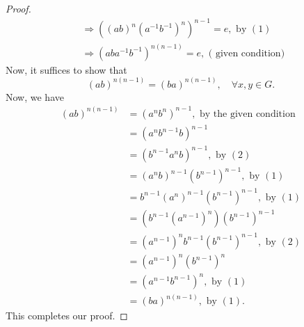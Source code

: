 \documentclass{article}
\begin{document}
\begin{proof}
$$\begin{aligned}
& \Longrightarrow\left((a b)^n\left(a^{-1} b^{-1}\right)^n\right)^{n-1}=e, \text { by }(1) \\
& \Longrightarrow\left(a b a^{-1} b^{-1}\right)^{n(n-1)}=e, \text { ( given condition) }
\end{aligned}
$$
Now, it suffices to show that
$$
(a b)^{n(n-1)}=(b a)^{n(n-1)}, \quad \forall x, y \in G .
$$
Now, we have
$$
\begin{aligned}
(a b)^{n(n-1)} & =\left(a^n b^n\right)^{n-1}, \text { by the given condition } \\
& =\left(a^n b^{n-1} b\right)^{n-1} \\
& =\left(b^{n-1} a^n b\right)^{n-1}, \text { by }(2) \\
& =\left(a^n b\right)^{n-1}\left(b^{n-1}\right)^{n-1}, \text { by }(1) \\
& =b^{n-1}\left(a^n\right)^{n-1}\left(b^{n-1}\right)^{n-1}, \text { by }(1) \\
& =\left(b^{n-1}\left(a^{n-1}\right)^n\right)\left(b^{n-1}\right)^{n-1} \\
& =\left(a^{n-1}\right)^n b^{n-1}\left(b^{n-1}\right)^{n-1}, \text { by }(2) \\
& =\left(a^{n-1}\right)^n\left(b^{n-1}\right)^n \\
& =\left(a^{n-1} b^{n-1}\right)^n, \text { by }(1) \\
& =(b a)^{n(n-1)}, \text { by }(1) .
\end{aligned}
$$
This completes our proof.
\end{proof}
\end{document}

